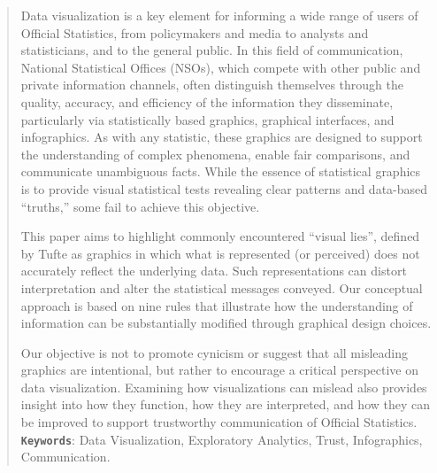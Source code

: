 \documentclass[11pt,twoside,a4paper]{article}
\begin{document}
\begin{abstract}
    Data visualization is a key element for informing a wide range of users of Official Statistics, from policymakers and media to analysts and statisticians, and to the general public. In this field of communication, National Statistical Offices (NSOs), which compete with other public and private information channels, often distinguish themselves through the quality, accuracy, and efficiency of the information they disseminate, particularly via statistically based graphics, graphical interfaces, and infographics. As with any statistic, these graphics are designed to support the understanding of complex phenomena, enable fair comparisons, and communicate unambiguous facts. While the essence of statistical graphics is to provide visual statistical tests revealing clear patterns and data-based “truths,” some fail to achieve this objective.
    
    This paper aims to highlight commonly encountered “visual lies”, defined by Tufte \citep{Tufte2001} as graphics in which what is represented (or perceived) does not accurately reflect the underlying data. Such representations can distort interpretation and alter the statistical messages conveyed. Our conceptual approach is based on nine rules that illustrate how the understanding of information can be substantially modified through graphical design choices. 
    
    Our objective is not to promote cynicism or suggest that all misleading graphics are intentional, but rather to encourage a critical perspective on data visualization. Examining how visualizations can mislead also provides insight into how they function, how they are interpreted, and how they can be improved to support trustworthy communication of Official Statistics.\\
    
    \textbf{\texttt{Keywords}}: Data Visualization, Exploratory Analytics, Trust,  Infographics, Communication.
\end{abstract}

\newpage
\end{document}

